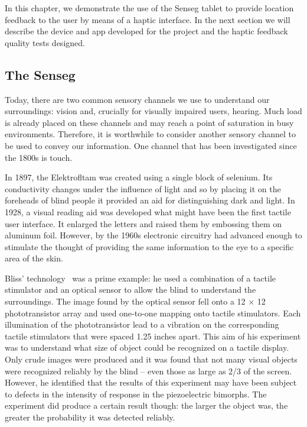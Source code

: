 In this chapter, we demonstrate the use of the Senseg tablet to provide location feedback to the user by means of a haptic interface. In the next section we will describe the device and app developed for the project and the haptic feedback quality tests designed.

\subsection{The Senseg}
Today, there are two common sensory channels we use to understand our surroundings: vision and, crucially for visually impaired users, hearing. Much load is already placed on these channels  and may reach a point of saturation in busy environments. Therefore, it is worthwhile to consider another sensory channel to be used to convey our information. One channel that has been investigated since the 1800s is touch. 

In 1897, the Elektrofltam was created using a single block of selenium.  Its conductivity changes under the influence of light and so by placing it on the foreheads of blind people  it provided an aid for distinguishing dark and light. In 1928, a visual reading aid was developed  what might have been the first tactile user interface. It enlarged the letters and raised them by embossing them on aluminum foil. However, by the 1960s electronic circuitry had advanced enough to stimulate the thought of providing the same information to the eye to a specific area of the skin.  

Bliss' technology~\citep{bliss1970optical} was a prime example: he used a combination of a tactile stimulator and an optical sensor to allow the blind to understand the surroundings. The image found by the optical sensor fell onto a 12 $\times$ 12 phototransistor array and used one-to-one mapping onto tactile stimulators. Each illumination of the phototransistor lead to a vibration on the corresponding tactile stimulators that were spaced 1.25 inches apart. This aim of his experiment was to understand what size of object could be recognized on a tactile display.  Only crude images were produced and it was found that not many visual objects were recognized reliably by the blind -- even those as large as 2/3 of the screen.  However, he identified that the results of this experiment may have been subject to defects in the intensity of response in the piezoelectric bimorphs.  The experiment did produce a certain result though: the larger the object was, the greater the probability it was detected reliably.  

